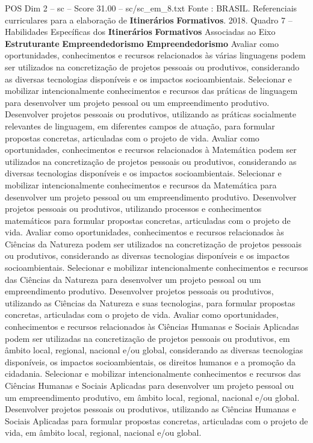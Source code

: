 \begin{textsample}{POS Dim 2 – sc – Score 31.00 – sc/sc\_em\_8.txt}
Fonte : BRASIL.
Referenciais curriculares para a elaboração de \textbf{Itinerários} \textbf{Formativos}. 2018.
Quadro 7 – Habilidades Específicas dos \textbf{Itinerários} \textbf{Formativos} Associadas ao Eixo \textbf{Estruturante} \textbf{Empreendedorismo} \textbf{Empreendedorismo} Avaliar como oportunidades, conhecimentos e recursos relacionados às várias linguagens podem ser utilizados na concretização de projetos pessoais ou produtivos, considerando as diversas tecnologias disponíveis e os impactos socioambientais.
Selecionar e mobilizar intencionalmente conhecimentos e recursos das práticas de linguagem para desenvolver um projeto pessoal ou um empreendimento produtivo.
Desenvolver projetos pessoais ou produtivos, utilizando as práticas socialmente relevantes de linguagem, em diferentes campos de atuação, para formular propostas concretas, articuladas com o projeto de vida.
Avaliar como oportunidades, conhecimentos e recursos relacionados à Matemática podem ser utilizados na concretização de projetos pessoais ou produtivos, considerando as diversas tecnologias disponíveis e os impactos socioambientais.
Selecionar e mobilizar intencionalmente conhecimentos e recursos da Matemática para desenvolver um projeto pessoal ou um empreendimento produtivo.
Desenvolver projetos pessoais ou produtivos, utilizando processos e conhecimentos matemáticos para formular propostas concretas, articuladas com o projeto de vida.
Avaliar como oportunidades, conhecimentos e recursos relacionados às Ciências da Natureza podem ser utilizados na concretização de projetos pessoais ou produtivos, considerando as diversas tecnologias disponíveis e os impactos socioambientais.
Selecionar e mobilizar intencionalmente conhecimentos e recursos das Ciências da Natureza para desenvolver um projeto pessoal ou um empreendimento produtivo.
Desenvolver projetos pessoais ou produtivos, utilizando as Ciências da Natureza e suas tecnologias, para formular propostas concretas, articuladas com o projeto de vida.
Avaliar como oportunidades, conhecimentos e recursos relacionados às Ciências Humanas e Sociais Aplicadas podem ser utilizadas na concretização de projetos pessoais ou produtivos, em âmbito local, regional, nacional e/ou global, considerando as diversas tecnologias disponíveis, os impactos socioambientais, os direitos humanos e a promoção da cidadania.
Selecionar e mobilizar intencionalmente conhecimentos e recursos das Ciências Humanas e Sociais Aplicadas para desenvolver um projeto pessoal ou um empreendimento produtivo, em âmbito local, regional, nacional e/ou global.
Desenvolver projetos pessoais ou produtivos, utilizando as Ciências Humanas e Sociais Aplicadas para formular propostas concretas, articuladas com o projeto de vida, em âmbito local, regional, nacional e/ou global.

\end{textsample}
